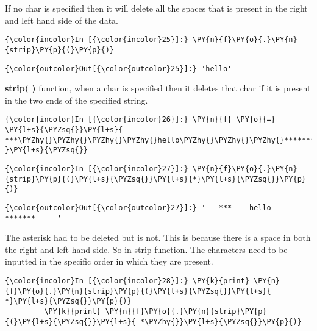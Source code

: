     If no char is specified then it will delete all the spaces that is
present in the right and left hand side of the data.

    \begin{Verbatim}[commandchars=\\\{\}]
{\color{incolor}In [{\color{incolor}25}]:} \PY{n}{f}\PY{o}{.}\PY{n}{strip}\PY{p}{(}\PY{p}{)}
\end{Verbatim}

            \begin{Verbatim}[commandchars=\\\{\}]
{\color{outcolor}Out[{\color{outcolor}25}]:} 'hello'
\end{Verbatim}
        
    \textbf{strip( )} function, when a char is specified then it deletes
that char if it is present in the two ends of the specified string.

    \begin{Verbatim}[commandchars=\\\{\}]
{\color{incolor}In [{\color{incolor}26}]:} \PY{n}{f} \PY{o}{=} \PY{l+s}{\PYZsq{}}\PY{l+s}{   ***\PYZhy{}\PYZhy{}\PYZhy{}\PYZhy{}hello\PYZhy{}\PYZhy{}\PYZhy{}*******     }\PY{l+s}{\PYZsq{}}
\end{Verbatim}

    \begin{Verbatim}[commandchars=\\\{\}]
{\color{incolor}In [{\color{incolor}27}]:} \PY{n}{f}\PY{o}{.}\PY{n}{strip}\PY{p}{(}\PY{l+s}{\PYZsq{}}\PY{l+s}{*}\PY{l+s}{\PYZsq{}}\PY{p}{)}
\end{Verbatim}

            \begin{Verbatim}[commandchars=\\\{\}]
{\color{outcolor}Out[{\color{outcolor}27}]:} '   ***----hello---*******     '
\end{Verbatim}
        
    The asterisk had to be deleted but is not. This is because there is a
space in both the right and left hand side. So in strip function. The
characters need to be inputted in the specific order in which they are
present.

    \begin{Verbatim}[commandchars=\\\{\}]
{\color{incolor}In [{\color{incolor}28}]:} \PY{k}{print} \PY{n}{f}\PY{o}{.}\PY{n}{strip}\PY{p}{(}\PY{l+s}{\PYZsq{}}\PY{l+s}{ *}\PY{l+s}{\PYZsq{}}\PY{p}{)}
         \PY{k}{print} \PY{n}{f}\PY{o}{.}\PY{n}{strip}\PY{p}{(}\PY{l+s}{\PYZsq{}}\PY{l+s}{ *\PYZhy{}}\PY{l+s}{\PYZsq{}}\PY{p}{)}
\end{Verbatim}

